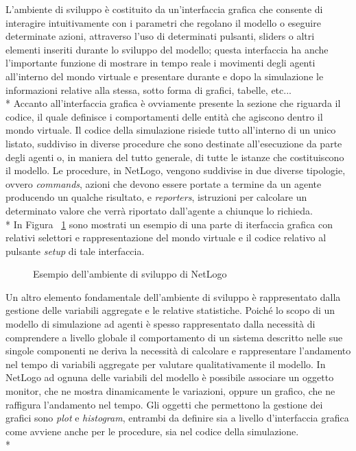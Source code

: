 \documentclass[12pt,a4paper,openright,twoside]{report}
\begin{document}
L'ambiente di sviluppo è costituito da un'interfaccia grafica che consente di interagire intuitivamente con i parametri che regolano il modello o eseguire determinate azioni, attraverso l'uso di determinati pulsanti, sliders o altri elementi inseriti durante lo sviluppo del modello; questa interfaccia ha anche l'importante funzione di mostrare in tempo reale i movimenti degli agenti all'interno del mondo virtuale e presentare durante e dopo la simulazione le informazioni relative alla stessa, sotto forma di grafici, tabelle, etc...\\*
Accanto all'interfaccia grafica è ovviamente presente la sezione che riguarda il codice, il quale definisce i comportamenti delle entità  che agiscono dentro il mondo virtuale. Il codice della simulazione risiede tutto all'interno di un unico listato, suddiviso in diverse procedure che sono destinate all'esecuzione da parte degli agenti o, in maniera del tutto generale, di tutte le istanze che costituiscono il modello. Le procedure, in NetLogo, vengono suddivise in due diverse tipologie, ovvero \emph{commands}, azioni che devono essere portate a termine da un agente producendo un qualche risultato, e \emph{reporters}, istruzioni per calcolare un determinato valore che verrà riportato dall'agente a chiunque lo richieda. \\*
In Figura ~\ref{netlogoUI_code} sono mostrati un esempio di una parte di iterfaccia grafica con relativi selettori e rappresentazione del mondo virtuale e il codice relativo al pulsante \emph{setup} di tale interfaccia.

\begin{figure}[H]
	\centering
	\quad 
	\caption{Esempio dell'ambiente di sviluppo di NetLogo}
	\label{netlogoUI_code}
\end{figure}

Un altro elemento fondamentale dell'ambiente di sviluppo è rappresentato dalla gestione delle variabili aggregate e le relative statistiche. Poiché lo scopo di un modello di simulazione ad agenti è spesso rappresentato dalla necessità di comprendere a livello globale il comportamento di un sistema descritto nelle sue singole componenti ne deriva la necessità di calcolare e rappresentare l'andamento nel tempo di variabili aggregate per valutare qualitativamente il modello. In NetLogo ad ognuna delle variabili del modello è possibile associare un oggetto monitor, che ne mostra dinamicamente le variazioni, oppure un grafico, che ne raffigura l'andamento nel tempo. Gli  oggetti che permettono la gestione dei grafici sono \emph{plot} e \emph{histogram}, entrambi da definire sia a livello d'interfaccia grafica come avviene anche per le procedure, sia nel codice della simulazione.\\* 
\end{document}

